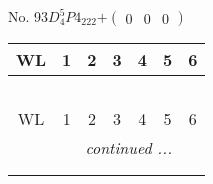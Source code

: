 \documentclass[fleqn,9pt,landscape]{jsarticle}
\begin{document}
\newpage
No. 93\quad$D_{4}^{5}$\quad$P4_222$\quad[ tetragonal ]\quad$+\begin{pmatrix} 0 & 0 & 0 \end{pmatrix}$
\begin{center}
\renewcommand{\arraystretch}{1.2}
\begin{longtable}{ccccccc}
 \hline \hline
WL & 1 & 2 & 3 & 4 & 5 & 6 \\ \hline \endfirsthead

\multicolumn{6}{l}{\tablename\ \thetable{}} \\
 \hline \hline
WL & 1 & 2 & 3 & 4 & 5 & 6 \\ \hline \endhead

 \hline \hline
\multicolumn{6}{r}{\footnotesize\it continued ...} \\ \endfoot

 \hline \hline
\multicolumn{6}{r}{} \\ \endlastfoot


\end{longtable}
\end{center}
\end{document}
